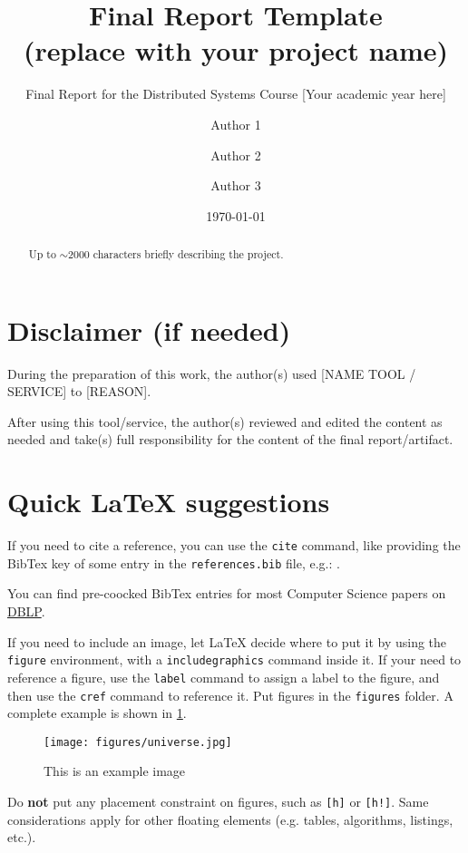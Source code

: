 \documentclass{scrartcl}
\title{\LARGE
    Final Report Template\\
    (replace with your project name)
}
\subtitle{Final Report for the Distributed Systems Course [Your academic year here]}
\author{
    Author 1 \\ \emailaddr{author1@email.it}
    \and
    Author 2 \\ \emailaddr{author2@gmail.com}
    \and
    Author 3 \\ \emailaddr{author3@unibo.it}
}
\date{\today}
\begin{document}
\maketitle

\begin{abstract}
    Up to $\sim$2000 characters briefly describing the project.
\end{abstract}

\section*{Disclaimer (if needed)}

During the preparation of this work, the author(s) used [NAME TOOL / SERVICE] to [REASON].

After using this tool/service, 
the author(s) reviewed and edited the content as needed 
and take(s) full responsibility for the content of the final report/artifact.

\section*{Quick \LaTeX{} suggestions}

If you need to cite a reference, you can use the \texttt{cite} command, 
like providing the BibTex key of some entry in the \texttt{references.bib} file, 
e.g.: \cite{adams1995hitchhiker}.

You can find pre-coocked BibTex entries for most Computer Science papers on \href{https://dblp.uni-trier.de/}{DBLP}.

If you need to include an image,
let \LaTeX{} decide where to put it by using the \texttt{figure} environment,
with a \texttt{includegraphics} command inside it.
%
If your need to reference a figure,
use the \texttt{label} command to assign a label to the figure,
and then use the \texttt{cref} command to reference it.
%
Put figures in the \texttt{figures} folder.
%
A complete example is shown in \cref{fig:universe}.

\begin{figure}
    \centering
    \texttt{[image: figures/universe.jpg]}
    \caption{This is an example image}
    \label{fig:universe}
\end{figure}

Do \textbf{not} put any placement constraint on figures,
such as \texttt{[h]} or \texttt{[h!]}.
%
Same considerations apply for other floating elements 
(e.g. tables, algorithms, listings, etc.).
\end{document}
